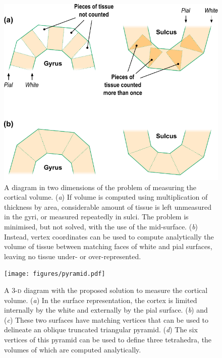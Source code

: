 \begin{figure}[!tp]
\begin{center}
\includegraphics[scale=.9]{figures/mantle.pdf}
\caption[A \textsc{2-d} diagram of the problem of measuring the cortical volume.]{A diagram in two dimensions of the problem of measuring the cortical volume. (\emph{a}) If volume is computed using multiplication of thickness by area, considerable amount of tissue is left unmeasured in the gyri, or measured repeatedly in sulci. The problem is minimised, but not solved, with the use of the mid-surface. (\emph{b}) Instead, vertex coordinates can be used to compute analytically the volume of tissue between matching faces of white and pial surfaces, leaving no tissue under- or over-represented.}
\label{fig:mantle} 
\end{center}
\end{figure}

\begin{figure}[!tp]
\begin{center}
\texttt{[image: figures/pyramid.pdf]}
\caption[A \textsc{3-d} diagram with the proposed solution to measure the cortical volume.]{A \textsc{3-d} diagram with the proposed solution to measure the cortical volume. (\emph{a}) In the surface representation, the cortex is limited internally by the white and externally by the pial surface. (\emph{b}) and (\emph{c}) These two surfaces have matching vertices that can be used to delineate an oblique truncated triangular pyramid. (\emph{d}) The six vertices of this pyramid can be used to define three tetrahedra, the volumes of which are computed analytically.}
\label{fig:pyramid}
\end{center}
\end{figure}


